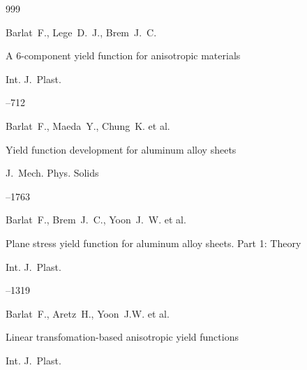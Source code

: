\begin{thebibliography}{999}




\by Barlat~F., Lege~D.~J., Brem~J.~C.

\paper A 6-component yield function for anisotropic materials

\jour Int. J.~Plast.




--712






\by Barlat~F., Maeda~Y., Chung~K. et al.

\paper Yield function development for aluminum alloy sheets

\jour J.~Mech. Phys. Solids




--1763






\by Barlat~F., Brem~J.~C., Yoon~J.~W. et al.

\paper Plane stress yield function for aluminum alloy sheets. Part 1: Theory

\jour Int. J.~Plast.




--1319






\by Barlat~F., Aretz~H., Yoon~J.W. et al.

\paper Linear transfomation-based anisotropic yield functions

\jour Int. J.~Plast.



\end{thebibliography}
